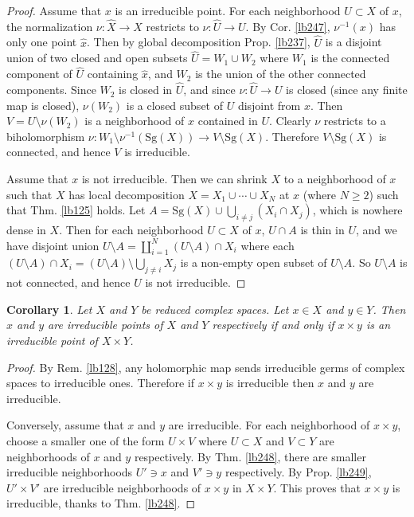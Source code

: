 \documentclass[12pt,b5paper,notitlepage]{report}
\theoremstyle{definition}
\theoremstyle{plain}
\newtheorem{co}[df]{Corollary}
\newcommand{\wht}{\widehat}
\newcommand{\Sg}{\mathrm{Sg}}
\numberwithin{equation}{section}
\begin{document}
\begin{proof}
Assume that $x$ is an irreducible point. For each neighborhood $U\subset X$ of $x$, the normalization $\nu:\wht X\rightarrow X$ restricts to $\nu:\wht U\rightarrow U$. By Cor. \ref{lb247}, $\nu^{-1}(x)$ has only one point $\wht x$. Then by global decomposition Prop. \ref{lb237}, $\wht U$ is a disjoint union of two closed and open subsets $\wht U=W_1\cup W_2$ where $W_1$ is the connected component of $\wht U$ containing $\wht x$, and $W_2$ is the union of the other connected components. Since $W_2$ is closed in $\wht U$, and since $\nu:\wht U\rightarrow U$ is closed (since any finite map is closed), $\nu(W_2)$ is a closed subset of $U$ disjoint from $x$. Then $V=U\setminus\nu(W_2)$ is a neighborhood of $x$ contained in $U$. Clearly $\nu$ restricts to a biholomorphism $\nu:W_1\setminus\nu^{-1}(\Sg(X))\rightarrow V\setminus\Sg(X)$. Therefore $V\setminus\Sg(X)$ is connected, and hence $V$ is irreducible.

Assume that $x$ is not irreducible. Then we can shrink $X$ to a neighborhood of $x$ such that $X$ has local decomposition $X=X_1\cup\cdots\cup X_N$ at $x$ (where $N\geq 2$) such that Thm. \ref{lb125} holds. Let $A=\Sg(X)\cup\bigcup_{i\neq j}(X_i\cap X_j)$, which is nowhere dense in $X$. Then for each neighborhood $U\subset X$ of $x$, $U\cap A$ is thin in $U$, and we have disjoint union $U\setminus A=\coprod_{i=1}^N (U\setminus A)\cap X_i$ where each $(U\setminus A)\cap X_i=(U\setminus A)\setminus\bigcup_{j\neq i}X_j$ is a non-empty open subset of $U\setminus A$. So $U\setminus A$ is not connected, and hence $U$ is not irreducible.
\end{proof}







\begin{co}\label{lb250}
Let $X$ and $Y$ be reduced complex spaces. Let $x\in X$ and $y\in Y$. Then $x$ and $y$ are irreducible points of $X$ and $Y$ respectively if and only if $x\times y$ is an irreducible point of $X\times Y$.
\end{co}


\begin{proof}
By Rem. \ref{lb128}, any holomorphic map sends irreducible germs of complex spaces to irreducible ones. Therefore if $x\times y$ is irreducible then $x$ and $y$ are irreducible. 

Conversely, assume that $x$ and $y$ are irreducible. For each neighborhood of $x\times y$, choose a smaller one of the form $U\times V$ where $U\subset X$ and $V\subset Y$ are neighborhoods of $x$ and $y$ respectively. By Thm. \ref{lb248}, there are smaller irreducible neighborhoods $U'\ni x$ and $V'\ni y$ respectively. By Prop. \ref{lb249}, $U'\times V'$ are irreducible neighborhoods of $x\times y$ in $X\times Y$. This proves that $x\times y$ is irreducible, thanks to Thm. \ref{lb248}.
\end{proof}
\end{document}
